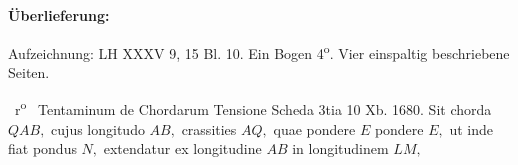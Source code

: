 %
%
%
\begin{ledgroupsized}[r]{120mm}
\footnotesize
\pstart
\noindent\textbf{Überlieferung:}
\pend
\end{ledgroupsized}
\begin{ledgroupsized}[r]{114mm}
\footnotesize
\pstart \parindent -6mm
%
Aufzeichnung: LH XXXV 9, 15 Bl. 10.
Ein Bogen 4\textsuperscript{o}.
Vier einspaltig beschriebene Seiten.
\pend
\end{ledgroupsized}
%
%
\vspace{4mm}%
%
%
\count{}
\count{}
\count{}
%
%
\pstart%
\normalsize%
\noindent%
%
~r\textsuperscript{o}\rbrack\ %
%
\pend%
%
\pstart%
\centering%
Tentaminum de Chordarum Tensione Scheda 3tia 10 Xb. 1680.%
\protect{}%
\protect{}%
\protect{}
\pend%
 \vspace{0.5em}%
%
%
\pstart%
\noindent%
Sit chorda $QAB,$\protect{}
cujus longitudo $AB,$\protect{}
crassities $AQ,$\protect{}
quae pondere $E$\protect{}
pondere $E,$
ut inde fiat pondus $N,$\protect{}
extendatur ex longitudine $AB$ in longitudinem $LM,$\protect{}
